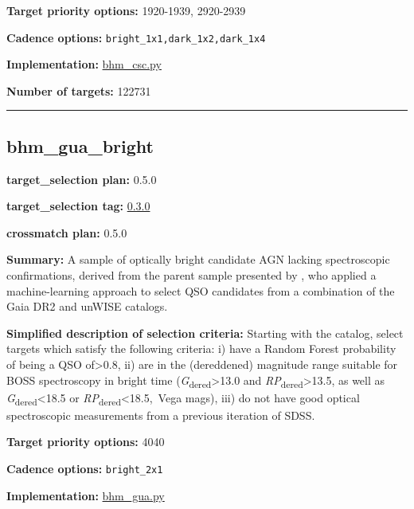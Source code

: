 \noindent\textbf{Target priority options:} 1920-1939, 2920-2939

\noindent\textbf{Cadence options:} \texttt{bright\_1x1,dark\_1x2,dark\_1x4}

\noindent\textbf{Implementation:}
\href{https://github.com/sdss/target_selection/blob/0.3.14/python/target_selection/cartons/bhm_csc.py}{bhm\_csc.py}

\noindent\textbf{Number of targets:} 122731

\begin{center}\rule{0.5\linewidth}{0.5pt}\end{center}

\hypertarget{bhm_gua_bright_plan0.5.0}{%
\subsection{bhm\_gua\_bright}\label{bhm_gua_bright_plan0.5.0}}

\noindent\textbf{target\_selection plan:} 0.5.0

\noindent\textbf{target\_selection tag:}
\href{https://github.com/sdss/target_selection/tree/0.3.0/}{0.3.0}

\noindent\textbf{crossmatch plan:} 0.5.0

\noindent\textbf{Summary:} A sample of optically bright candidate AGN lacking
spectroscopic confirmations, derived from the parent sample presented by
\citet{Shu2019}, who applied a machine-learning approach to select QSO
candidates from a combination of the Gaia DR2 and unWISE catalogs.

\noindent\textbf{Simplified description of selection criteria:} Starting with the
\citet{Shu2019} catalog, select targets which satisfy the following
criteria: i) have a Random Forest probability of being a QSO
of\textgreater0.8, ii) are in the (dereddened) magnitude range suitable
for BOSS spectroscopy in bright time
(\emph{G}\textsubscript{dered}\textgreater13.0 and
\emph{RP}\textsubscript{dered}\textgreater13.5, as well as
\emph{G}\textsubscript{dered}\textless18.5 or
\emph{RP}\textsubscript{dered}\textless18.5,~Vega mags), iii) do not
have good optical spectroscopic measurements from a previous iteration
of SDSS.


\noindent\textbf{Target priority options:} 4040

\noindent\textbf{Cadence options:} \texttt{bright\_2x1}

\noindent\textbf{Implementation:}
\href{https://github.com/sdss/target_selection/blob/0.3.0/python/target_selection/cartons/bhm_gua.py}{bhm\_gua.py}

